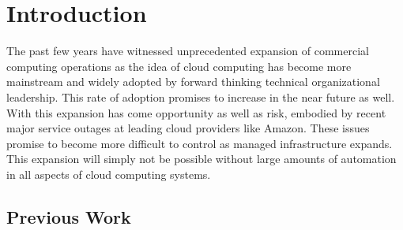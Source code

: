 \section{Introduction}
The past few years have witnessed unprecedented expansion of commercial computing operations as the idea of cloud computing has become more mainstream and widely adopted by forward thinking technical organizational leadership.  This rate of adoption promises to increase in the near future as well.  With this expansion has come opportunity as well as risk, embodied by recent major service outages at leading cloud providers like Amazon.  These issues promise to become more difficult to control as managed infrastructure expands.  This expansion will simply not be possible without large amounts of automation in all aspects of cloud computing systems.



\subsection{Previous Work}
